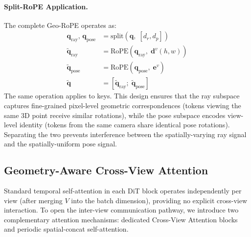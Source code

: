 \paragraph{Split-RoPE Application.}
The complete Geo-RoPE operates as:
\begin{equation}
\label{eq:geo-rope}
\begin{aligned}
\mathbf{q}_{\text{ray}},\, \mathbf{q}_{\text{pose}} &= \text{split}(\mathbf{q},\; [d_r, d_p]) \\
\tilde{\mathbf{q}}_{\text{ray}} &= \text{RoPE}(\mathbf{q}_{\text{ray}},\; \mathbf{d}^v(h,w)) \\
\tilde{\mathbf{q}}_{\text{pose}} &= \text{RoPE}(\mathbf{q}_{\text{pose}},\; \mathbf{e}^v) \\
\tilde{\mathbf{q}} &= [\tilde{\mathbf{q}}_{\text{ray}};\; \tilde{\mathbf{q}}_{\text{pose}}]
\end{aligned}
\end{equation}
The same operation applies to keys. This design ensures that the ray subspace captures fine-grained pixel-level geometric correspondences (tokens viewing the same 3D point receive similar rotations), while the pose subspace encodes view-level identity (tokens from the same camera share identical pose rotations). Separating the two prevents interference between the spatially-varying ray signal and the spatially-uniform pose signal.

\subsection{Geometry-Aware Cross-View Attention}
\label{sec:cross-view-attn}

Standard temporal self-attention in each DiT block operates independently per view (after merging $V$ into the batch dimension), providing no explicit cross-view interaction. To open the inter-view communication pathway, we introduce two complementary attention mechanisms: dedicated Cross-View Attention blocks and periodic spatial-concat self-attention.

